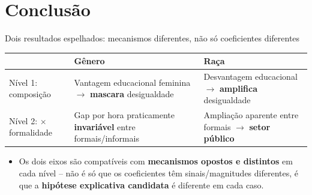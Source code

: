 \documentclass[aspectratio=169]{beamer}
\newcommand{\highlight}[1]{\textcolor{accentblue}{\textbf{#1}}}
\begin{document}
\section{Conclus\~ao}

\begin{frame}{Dois resultados espelhados: mecanismos diferentes, n\~ao s\'o coeficientes diferentes}
  \begin{center}
    \footnotesize
    \renewcommand{\arraystretch}{1.5}
    \begin{tabular}{p{2.1cm}p{4.3cm}p{4.3cm}}
      \toprule
       & \highlight{G\^enero} & \highlight{Ra\c{c}a} \\
      \midrule
      N\'ivel 1: composi\c{c}\~ao & Vantagem educacional feminina $\to$ \highlight{mascara} desigualdade & Desvantagem educacional $\to$ \highlight{amplifica} desigualdade \\
      N\'ivel 2: $\times$ formalidade & Gap por hora praticamente \highlight{invari\'avel} entre formais/informais & Amplia\c{c}\~ao aparente entre formais $\to$ \highlight{setor p\'ublico} \\
      \bottomrule
    \end{tabular}
  \end{center}
  \footnotesize
  \begin{itemize}
    \item Os dois eixos s\~ao compat\'iveis com \highlight{mecanismos opostos e distintos} em cada n\'ivel -- n\~ao \'e s\'o que os coeficientes t\^em sinais/magnitudes diferentes, \'e que a \highlight{hip\'otese explicativa candidata} \'e diferente em cada caso.
  \end{itemize}
\end{frame}
\end{document}
